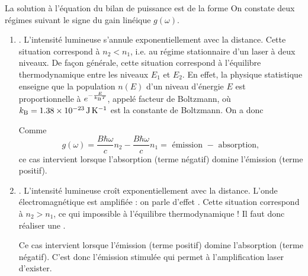 \documentclass[12pt,fancy]{cours}
\begin{document}
La solution à l'équation du bilan de puissance est de la forme
On constate deux régimes suivant le signe du gain linéique $g(\omega)$.
\begin{enumerate}
\item {}. 
L'intensité lumineuse s'annule exponentiellement avec la distance. Cette situation correspond à $n_2 <n_1$, i.e. au régime stationnaire d'un laser à deux niveaux. De façon générale, cette situation correspond à l’équilibre thermodynamique entre les niveaux $E_1$ et $E_2$. En effet, la physique statistique enseigne que la population $n(E)$ d’un niveau d’énergie $E$ est proportionnelle à
$ e^{ -\frac{E}{k_{\rm B} T}}$,
appelé facteur de Boltzmann,
où $k_{\rm B} = \SI{1.38e-23}{J.K^{-1}}$ est la constante de Boltzmann.  On a donc 


\begin{remarque}
  Comme $$g(\omega) = \frac{B\hbar\omega}{c}n_2-\frac{B\hbar\omega}{c}n_1  = \text{ émission } - \text{ absorption},$$ ce cas intervient lorsque l'absorption (terme négatif) domine l’émission (terme positif).
\end{remarque}
\item {}. L'intensité lumineuse croît exponentiellement avec la distance. L'onde électromagnétique est amplifiée : on parle d’effet . Cette situation correspond à $n_2 >n_1$, ce qui impossible à l’équilibre thermodynamique ! Il faut donc réaliser une .

\begin{remarque}
  Ce cas intervient lorsque l'émission (terme positif) domine l’absorption (terme négatif). C'est donc l'émission stimulée qui permet à l'amplification laser d'exister.
\end{remarque}
\end{enumerate}
\end{document}
